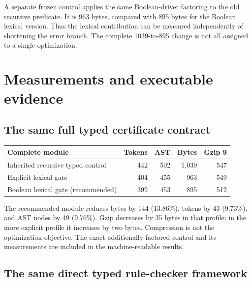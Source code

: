 \documentclass[11pt,a4paper]{article}
\theoremstyle{definition}\newtheorem{definition}[theorem]{Definition}
\begin{document}
A separate frozen control applies the same Boolean-driver factoring to
the old recursive predicate. It is 963 bytes, compared with 895 bytes for
the Boolean lexical version. Thus the lexical contribution can be
measured independently of shortening the error branch. The complete
1039-to-895 change is not all assigned to a single optimization.

\section{Measurements and executable evidence}
\label{sec:measurements}

\subsection{The same full typed certificate contract}

\begin{center}\small
\begin{tabular}{lrrrr}
\toprule
Complete module & Tokens & AST & Bytes & Gzip 9\\
\midrule
Inherited recursive typed control & 442 & 502 & 1,039 & 547\\
Explicit lexical gate & 404 & 455 & 963 & 549\\
Boolean lexical gate (recommended) & 399 & 453 & 895 & 512\\
\bottomrule
\end{tabular}
\end{center}
The recommended module reduces bytes by 144 (13.86\%), tokens by 43
(9.73\%), and AST nodes by 49 (9.76\%). Gzip decreases by 35 bytes in
that profile; in the more explicit profile it increases by two bytes.
Compression is not the optimization objective. The exact additionally
factored control and its measurements are included in the machine-readable
results.

\subsection{The same direct typed rule-checker framework}
\end{document}
